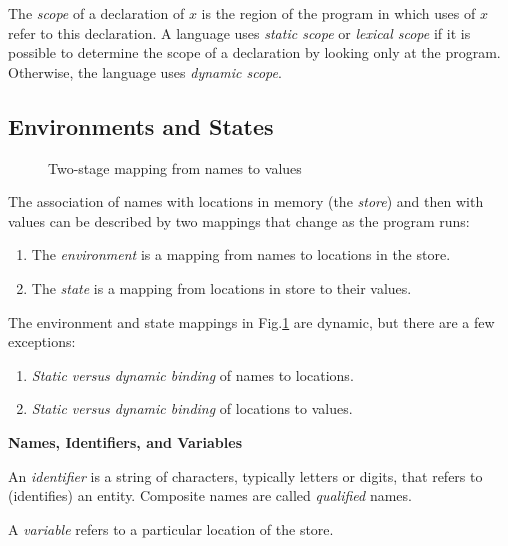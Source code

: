 \documentclass[12pt,a4paper,twoside,openany]{book}
\begin{document}
The \textit{scope} of a declaration of $x$ is the region of the program in which uses of $x$ refer to this declaration. A language uses \textit{static scope} or \textit{lexical scope} if it is possible to determine the scope of a declaration by looking only at the program. Otherwise, the language uses \textit{dynamic scope}.

\subsection{Environments and States}

\begin{figure}[htbp]
    \centering
    \caption{Two-stage mapping from names to values}
    \label{figure:1.8}
\end{figure}

The association of names with locations in memory (the \textit{store}) and then with values can be described by two mappings that change as the program runs:
\begin{enumerate}
    \item The \textit{environment} is a mapping from names to locations in the store.
    \item The \textit{state} is a mapping from locations in store to their values.
\end{enumerate}

The environment and state mappings in Fig.\;\ref{figure:1.8} are dynamic, but there are a few exceptions:
\begin{enumerate}
    \item \textit{Static versus dynamic binding} of names to locations.
    \item \textit{Static versus dynamic binding} of locations to values.
\end{enumerate}

\begin{framed}
\begin{center}
    \textbf{{\large Names, Identifiers, and Variables}}
\end{center}

An \textit{identifier} is a string of characters, typically letters or digits, that refers to (identifies) an entity. Composite names are called \textit{qualified} names.

A \textit{variable} refers to a particular location of the store.
\end{framed}
\end{document}
